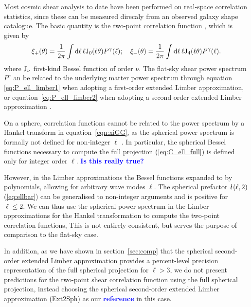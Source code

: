 \documentclass[fleqn,usenatbib]{mnras} %
\newcommand{\ellbar}{\hbox{\it \l}\,}
\newcommand{\mk}[1]{{\bf\textcolor{blue}{#1}}}
\begin{document}
Most cosmic shear analysis to date have been performed on real-space
correlation statistics, since these can be measured direcaly from an observed
galaxy shape catalogue. The basic quantity is the two-point correlation
function \citep{miraldaescude:1991}, which is given by
%
\begin{eqnarray}
  \xi_+(\theta) 
  = \frac 1 {2\pi} \int {\rm d} \ell \, \ell {\rm J}_0(\ell
   \theta)
  P^\gamma(\ell);
  \quad
   \xi_-(\theta)
  = \frac 1 {2\pi} \int
   {\rm d} \ell \, \ell {\rm J}_4(\ell \theta)
  P^\gamma(\ell).
   \label{eqn:xiGG}
\end{eqnarray}
%
where ${\rm J}_\nu$ first-kind Bessel function of order $\nu$. The flat-sky
shear power spectrum $P^\gamma$ an be related to the underlying matter power
spectrum through equation \ref{eq:P_ell_limber1} when adopting a first-order
extended Limber approximation, or equation~\ref{eq:P_ell_limber2} when adopting
a second-order extended Limber approximation \citep[for more details see][and
references therein]{miraldaescude:1991, kaiser:1992,
bartelmann/schneider:2001}.

On a sphere, correlation functions cannot be related to the power spectrum by a
Hankel transform in equation~\ref{eqn:xiGG}, as the spherical power spectrum is
formally not defined for non-integer $\ell$ \citep[see][for alternative
spherical-sky formulae for the two-point correlation
function]{2005PhRvD..72b3516C}. In particular, the spherical Bessel functions
necessary to compute the full projection (\ref{eq:C_ell_full}) is defined only
for integer order $\ell$. \mk{Is this really true?}

However, in the Limber approximations the Bessel functions expanded to by
polynomials, allowing for arbitrary wave modes $\ell$. The spherical prefactor
$\ellbar(\ell, 2)$ (\ref{eq:ellbar}) can be generalised to non-integer
arguments and is positive for $\ell \le 2$. We can thus use the spherical power
spectrum in the Limber approximations for the Hankel transformation to compute
the two-point correlation functions, This is not entirely consistent, but
serves the purpose of comparison to the flat-sky case.

In addition, as we have shown in section~\ref{sec:comp} that the spherical
second-order extended Limber approximation provides a percent-level precision
representation of the full spherical projection for $\ell > 3$, we do not
present predictions for the two-point shear correlation function using the full
spherical projection, instead choosing the spherical second-order extended
Limber approximation (Ext2Sph) as our \mk{reference} in this case.
\end{document}
